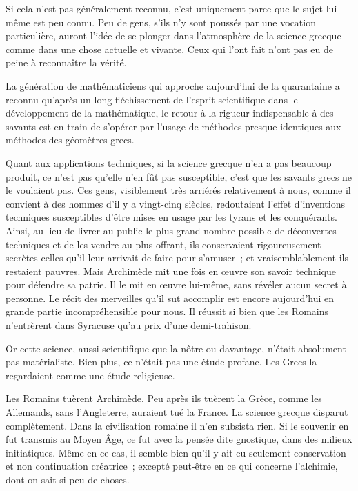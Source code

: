 \documentclass[french,twoside]{book} %
\begin{document}
Si cela n'est pas généralement reconnu, c'est uniquement parce que le sujet lui-même est peu connu. Peu de gens, s'ils n'y sont poussés par une vocation particulière, auront l'idée de se plonger dans l'atmosphère de la science grecque comme dans une chose actuelle et vivante. Ceux qui l'ont fait n'ont pas eu de peine à reconnaître la vérité.\par
La génération de mathématiciens qui approche aujourd'hui de la quarantaine a reconnu qu'après un long fléchissement de l'esprit scientifique dans le développement de la mathématique, le retour à la rigueur indispensable à des savants est en train de s'opérer par l'usage de méthodes presque identiques aux méthodes des géomètres grecs.\par
Quant aux applications techniques, si la science grecque n'en a pas beaucoup produit, ce n'est pas qu'elle n'en fût pas susceptible, c'est que les savants grecs ne le voulaient pas. Ces gens, visiblement très arriérés relativement à nous, comme il convient à des hommes d'il y a vingt-cinq siècles, redoutaient l'effet d'inventions techniques susceptibles d'être mises en usage par les tyrans et les conquérants. Ainsi, au lieu de livrer au public le plus grand nombre possible de découvertes techniques et de les vendre au plus offrant, ils conservaient rigoureusement secrètes celles qu'il leur arrivait de faire pour s'amuser ; et vraisemblablement ils restaient pauvres. Mais Archimède mit une fois en œuvre son savoir technique pour défendre sa patrie. Il le mit en œuvre lui-même, sans révéler aucun secret à personne. Le récit des merveilles qu'il sut accomplir est encore aujourd'hui en grande partie incompréhensible pour nous. Il réussit si bien que les Romains n'entrèrent dans Syracuse qu'au prix d'une demi-trahison.\par
Or cette science, aussi scientifique que la nôtre ou davantage, n'était absolument pas matérialiste. Bien plus, ce n'était pas une étude profane. Les Grecs la regardaient comme une étude religieuse.\par
\par
Les Romains tuèrent Archimède. Peu après ils tuèrent la Grèce, comme les Allemands, sans l'Angleterre, auraient tué la France. La science grecque disparut complètement. Dans la civilisation romaine il n'en subsista rien. Si le souvenir en fut transmis au Moyen Âge, ce fut avec la pensée dite gnostique, dans des milieux initiatiques. Même en ce cas, il semble bien qu'il y ait eu seulement conservation et non continuation créatrice ; excepté peut-être en ce qui concerne l'alchimie, dont on sait si peu de choses.\par
\end{document}
